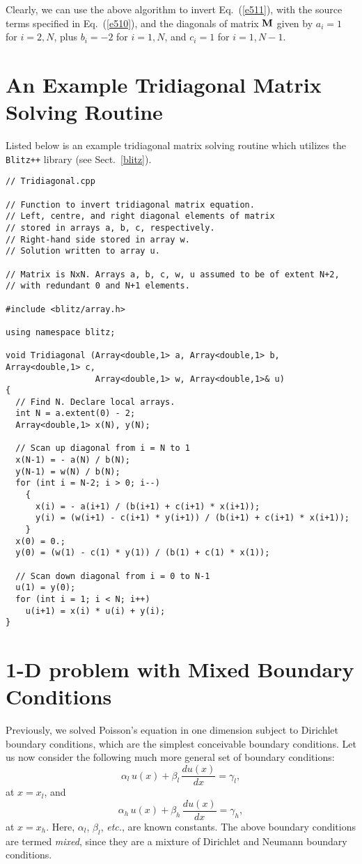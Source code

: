 Clearly, we can use the above algorithm to invert Eq.~(\ref{e511}), with the source terms
specified in Eq.~(\ref{e510}), and the diagonals of matrix ${\bf M}$ given by
$a_i=1$ for $i=2,N$, plus $b_i = -2$ for $i=1,N$, and $c_i = 1$ for $i=1, N-1$. 

\section{An Example Tridiagonal Matrix Solving Routine}
Listed below is an example tridiagonal matrix solving routine
which utilizes the {\tt Blitz++} library (see Sect.~\ref{blitz}).
{\small\begin{verbatim}
// Tridiagonal.cpp

// Function to invert tridiagonal matrix equation.
// Left, centre, and right diagonal elements of matrix
// stored in arrays a, b, c, respectively.
// Right-hand side stored in array w.
// Solution written to array u.

// Matrix is NxN. Arrays a, b, c, w, u assumed to be of extent N+2,
// with redundant 0 and N+1 elements.

#include <blitz/array.h>

using namespace blitz;

void Tridiagonal (Array<double,1> a, Array<double,1> b, Array<double,1> c, 
                  Array<double,1> w, Array<double,1>& u)
{
  // Find N. Declare local arrays.	
  int N = a.extent(0) - 2;
  Array<double,1> x(N), y(N);

  // Scan up diagonal from i = N to 1
  x(N-1) = - a(N) / b(N);
  y(N-1) = w(N) / b(N);
  for (int i = N-2; i > 0; i--)
    {
      x(i) = - a(i+1) / (b(i+1) + c(i+1) * x(i+1));
      y(i) = (w(i+1) - c(i+1) * y(i+1)) / (b(i+1) + c(i+1) * x(i+1));
    }
  x(0) = 0.;
  y(0) = (w(1) - c(1) * y(1)) / (b(1) + c(1) * x(1));

  // Scan down diagonal from i = 0 to N-1
  u(1) = y(0);
  for (int i = 1; i < N; i++)
    u(i+1) = x(i) * u(i) + y(i);
}
\end{verbatim}}

\section{1-D problem with Mixed Boundary Conditions}\label{tri}
Previously, we solved Poisson's equation in one dimension subject
to Dirichlet boundary conditions, which are the simplest
conceivable boundary conditions. Let us now consider the following much more general
set of boundary conditions:
\begin{equation}\label{e527}
\alpha_l\,u(x) + \beta_l\,\frac{du(x)}{dx} = \gamma_l,
\end{equation}
at $x=x_l$, and
\begin{equation}\label{e528}
\alpha_h \,u(x)+ \beta_h\,\frac{du(x)}{dx} = \gamma_h,
\end{equation}
at $x=x_h$. Here, $\alpha_l$, $\beta_l$, {\em etc.}, are known constants. The above
boundary conditions are termed {\em mixed}, since they are a mixture of Dirichlet and
Neumann boundary conditions.

